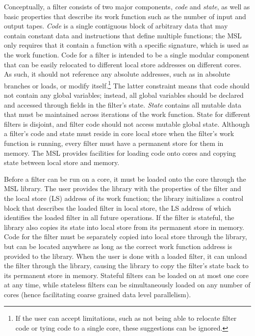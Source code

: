Conceptually, a filter consists of two major components, \emph{code}
and \emph{state}, as well as basic properties that describe its work
function such as the number of input and output tapes. \emph{Code} is
a single contiguous block of arbitrary data that may contain constant
data and instructions that define multiple functions; the MSL only
requires that it contain a function with a specific signature, which
is used as the work function. Code for a filter is intended to be a
single modular component that can be easily relocated to different
local store addresses on different cores. As such, it should not
reference any absolute addresses, such as in absolute branches or
loads, or modify itself.\footnote{If the user can accept limitations,
such as not being able to relocate filter code or tying code to a
single core, these suggestions can be ignored.} The latter constraint
means that code should not contain any global variables; instead, all
global variables should be declared and accessed through fields in the
filter's state. \emph{State} contains all mutable data that must be
maintained across iterations of the work function. State for different
filters is disjoint, and filter code should not access mutable global
state. Although a filter's code and state must reside in core local
store when the filter's work function is running, every filter must
have a permanent store for them in memory. The MSL provides
facilities for loading code onto cores and copying state between local
store and memory.

Before a filter can be run on a core, it must be loaded onto the core
through the MSL library. The user provides the library with the
properties of the filter and the local store (LS) address of its work
function; the library initializes a control block that describes the
loaded filter in local store, the LS address of which identifies the
loaded filter in all future operations. If the filter is stateful, the
library also copies its state into local store from its permanent
store in memory. Code for the filter must be separately copied into
local store through the library, but can be located anywhere as long
as the correct work function address is provided to the library. When
the user is done with a loaded filter, it can unload the filter
through the library, causing the library to copy the filter's state
back to its permanent store in memory. Stateful filters can be loaded
on at most one core at any time, while stateless filters can be
simultaneously loaded on any number of cores (hence facilitating
coarse grained data level parallelism).

